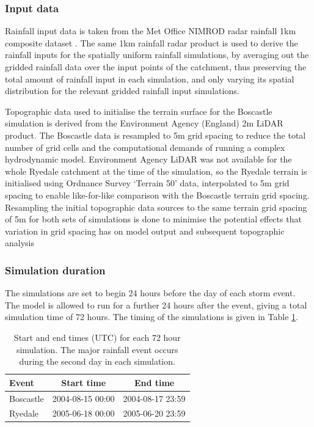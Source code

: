 \subsubsection{Input data}
Rainfall input data is taken from the Met Office NIMROD radar rainfall 1km composite dataset \citep{metoffice2003nimrod}. The same 1km rainfall radar product is used to derive the rainfall inputs for the spatially uniform rainfall simulations, by averaging out the gridded rainfall data over the input points of the catchment, thus preserving the total amount of rainfall input in each simulation, and only varying its spatial distribution for the relevant gridded rainfall input simulations.

Topographic data used to initialise the terrain surface for the Boscastle simulation is derived from the Environment Agency (England) 2m LiDAR product. The Boscastle data is resampled to 5m grid spacing to reduce the total number of grid cells and the  computational demands of running a complex hydrodynamic model. Environment Agency LiDAR was not available for the whole Ryedale catchment at the time of the simulation, so the Ryedale terrain is initialised using Ordnance Survey `Terrain 50' data, interpolated to 5m grid spacing to enable like-for-like comparison with the Boscastle terrain grid spacing. Resampling the initial topographic data sources to the same terrain grid spacing of 5m for both sets of simulations is done to minimise the potential effects that variation in grid spacing has on model output and subsequent topographic analysis \citep[e.g][]{chang1991effect,schoorl2000three,haile2005effects,zhang2008effects}

\subsubsection{Simulation duration}

The simulations are set to begin 24 hours before the day of each storm event. The model is allowed to run for a further 24 hours after the event, giving a total simulation time of 72 hours. The timing of the simulations is given in Table \ref{table_start_time_hydrog_sims}.

\begin{table}[htbp]
\begin{tabular}{l c  c}
\textbf{Event}  &   \textbf{Start time} &  \textbf{End time} \\
\hline 
Boscastle          &  2004-08-15 00:00  &  2004-08-17 23:59 \\
Ryedale             &  2005-06-18 00:00  &  2005-06-20 23:59 \\
\hline

\end{tabular}
\caption{Start and end times (UTC) for each 72 hour simulation. The major rainfall event occurs during the second day in each simulation.}
\label{table_start_time_hydrog_sims}
\end{table}

